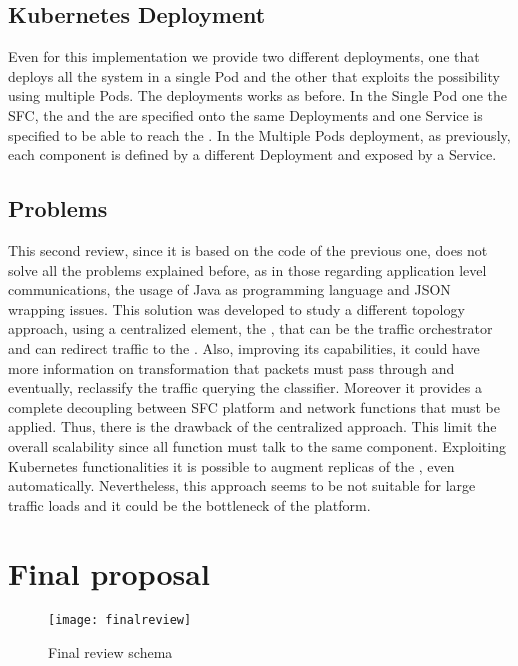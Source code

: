 \subsection{Kubernetes Deployment}
Even for this implementation we provide two different deployments, one that
deploys all the system in a single Pod and the other that exploits the
possibility using multiple Pods. The deployments works as before. In the Single
Pod one the SFC, the \enchainer{} and the \dispatcher{} are specified onto the
same Deployments and one Service is specified to be able to reach the
\enchainer{}. In the Multiple Pods deployment, as previously, each component is
defined by a different Deployment and exposed by a Service.

\subsection{Problems}
This second review, since it is based on the code of the previous one, does not
solve all the problems explained before, as in those regarding application
level communications, the usage of Java as programming language and JSON
wrapping issues. This solution was developed to study a different topology
approach, using a centralized element, the \dispatcher{}, that can be the
traffic orchestrator and can redirect traffic to the \vnfs{}. Also, improving
its capabilities, it could have more information on transformation that packets
must pass through and eventually, reclassify the traffic querying the
classifier. Moreover it provides a complete decoupling between SFC platform and
network functions that must be applied. Thus, there is the drawback of the
centralized approach. This limit the overall scalability since all function
must talk to the same component. Exploiting Kubernetes functionalities it is
possible to augment replicas of the \dispatcher{}, even automatically.
Nevertheless, this approach seems to be not suitable for large traffic loads
and it could be the bottleneck of the platform.

\section{Final proposal}

\begin{figure}
  \centering
  \texttt{[image: finalreview]}
  \caption{Final review schema}
  \label{chap:impl:img:finalreview}
\end{figure}


